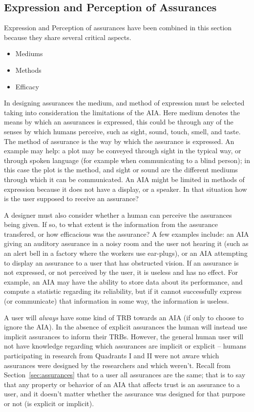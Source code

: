 \subsection{Expression and Perception of Assurances} \label{sec:express_assurances}
    Expression and Perception of assurances have been combined in this section because they share several critical aspects.
    
    \begin{itemize}
        \item Mediums
        \item Methods
        \item Efficacy
    \end{itemize}
    
    In designing assurances the medium, and method of expression must be selected taking into consideration the limitations of the AIA. Here medium denotes the means by which an assurances is expressed, this could be through any of the senses by which humans perceive, such as sight, sound, touch, smell, and taste. The method of assurance is the way by which the assurance is expressed. An example may help: a plot may be conveyed through sight in the typical way, or through spoken language (for example when communicating to a blind person); in this case the plot is the method, and sight or sound are the different mediums through which it can be communicated. An AIA might be limited in methods of expression because it does not have a display, or a speaker. In that situation how is the user supposed to receive an assurance?

    A designer must also consider whether a human can perceive the assurances being given. If so, to what extent is the information from the assurance transfered, or how efficacious was the assurance? A few examples include: an AIA giving an auditory assurance in a noisy room and the user not hearing it (such as an alert bell in a factory where the workers use ear-plugs), or an AIA attempting to display an assurance to a user that has obstructed vision. If an assurance is not expressed, or not perceived by the user, it is useless and has no effect. For example, an AIA may have the ability to store data about its performance, and compute a statistic regarding its reliability, but if it cannot successfully express (or communicate) that information in some way, the information is useless.

    A user will \emph{always} have some kind of TRB towards an AIA (if only to choose to ignore the AIA). In the absence of explicit assurances the human will instead use implicit assurances to inform their TRBs. However, the general human user will not have knowledge regarding which assurances are implicit or explicit -- humans participating in research from Quadrants I and II were not aware which assurances were designed by the researchers and which weren't. Recall from Section~\ref{sec:assurances} that to a user all assurances are the same; that is to say that any property or behavior of an AIA that affects trust is an assurance to a user, and it doesn't matter whether the assurance was designed for that purpose or not (is explicit or implicit).


